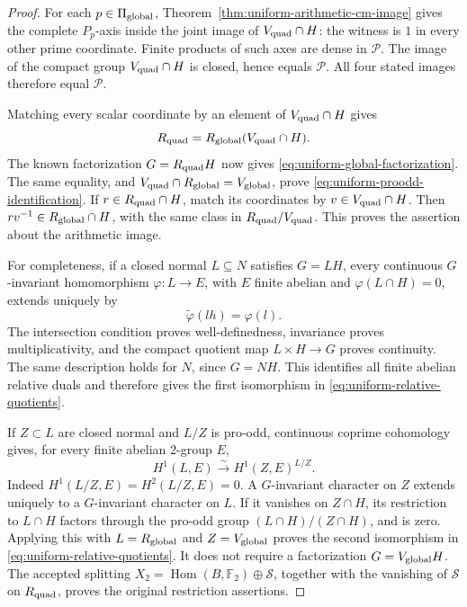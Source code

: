 \begin{proof}
For each \(p\in\Pi_{\rm global}\),
Theorem~\ref{thm:uniform-arithmetic-cm-image} gives the complete
\(P_p\)-axis inside the joint image of \(V_{\rm quad}\cap H\):
the witness is \(1\) in every other prime coordinate.
Finite products of such axes are dense in \(\mathcal P\).
The image of the compact group \(V_{\rm quad}\cap H\) is
closed, hence equals \(\mathcal P\). All four stated images
therefore equal \(\mathcal P\).

Matching every scalar coordinate by an element of
\(V_{\rm quad}\cap H\) gives
\[
 R_{\rm quad}=R_{\rm global}(V_{\rm quad}\cap H).
\]
The known factorization \(G=R_{\rm quad}H\) now gives
\eqref{eq:uniform-global-factorization}. The same equality,
and \(V_{\rm quad}\cap R_{\rm global}=V_{\rm global}\),
prove \eqref{eq:uniform-proodd-identification}.
If \(r\in R_{\rm quad}\cap H\), match its coordinates by
\(v\in V_{\rm quad}\cap H\). Then
\(rv^{-1}\in R_{\rm global}\cap H\), with the same class
in \(R_{\rm quad}/V_{\rm quad}\). This proves the assertion
about the arithmetic image.

For completeness, if a closed normal \(L\subseteq N\)
satisfies \(G=LH\), every continuous \(G\)-invariant
homomorphism \(\varphi:L\to E\), with \(E\) finite abelian
and \(\varphi(L\cap H)=0\), extends uniquely by
\[
 \widetilde\varphi(lh)=\varphi(l).
\]
The intersection condition proves well-definedness,
invariance proves multiplicativity, and the compact
quotient map \(L\times H\to G\) proves continuity.
The same description holds for \(N\), since \(G=NH\).
This identifies all finite abelian relative duals and
therefore gives the first isomorphism in
\eqref{eq:uniform-relative-quotients}.

If \(Z\subset L\) are closed normal and \(L/Z\) is pro-odd,
continuous coprime cohomology gives, for every finite
abelian \(2\)-group \(E\),
\[
 H^1(L,E)\xrightarrow{\ \sim\ }H^1(Z,E)^{L/Z}.
\]
Indeed \(H^1(L/Z,E)=H^2(L/Z,E)=0\).
A \(G\)-invariant character on \(Z\) extends uniquely to
a \(G\)-invariant character on \(L\). If it vanishes on
\(Z\cap H\), its restriction to \(L\cap H\) factors through
the pro-odd group \((L\cap H)/(Z\cap H)\), and is zero.
Applying this with \(L=R_{\rm global}\) and
\(Z=V_{\rm global}\) proves the second isomorphism in
\eqref{eq:uniform-relative-quotients}. It does not require
a factorization \(G=V_{\rm global}H\).
The accepted splitting
\(X_2=\operatorname{Hom}(B,\mathbb F_2)\oplus\mathcal S\),
together with the vanishing of \(\mathcal S\) on
\(R_{\rm quad}\), proves the original restriction assertions.


\end{proof}
